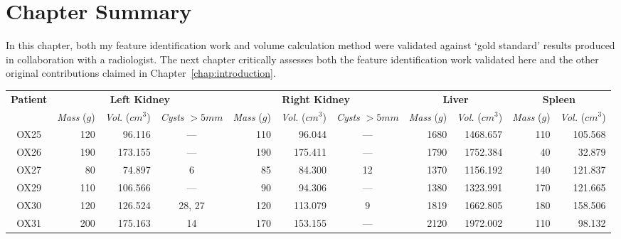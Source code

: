 \section{Chapter Summary}

In this chapter, both my feature identification work and volume calculation method were validated against `gold standard' results produced in collaboration with a radiologist. The next chapter critically assesses both the feature identification work validated here and the other original contributions claimed in Chapter~\ref{chap:introduction}.

\begin{landscape}
\begin{table}[p]
\footnotesize
\begin{center}
\begin{tabular}{c|rrc|rrc|rr|rr}
\textbf{Patient} & \multicolumn{3}{|c|}{\textbf{Left Kidney}} & \multicolumn{3}{|c|}{\textbf{Right Kidney}} & \multicolumn{2}{|c|}{\textbf{Liver}} & \multicolumn{2}{|c}{\textbf{Spleen}} \\
& \emph{Mass} ($g$) & \emph{Vol.} ($\mathit{cm}^3$) & \emph{Cysts} $> 5\mathit{mm}$ & \emph{Mass} ($g$) & \emph{Vol.} ($\mathit{cm}^3$) & \emph{Cysts} $> 5\mathit{mm}$ & \emph{Mass} ($g$) & \emph{Vol.} ($\mathit{cm}^3$) & \emph{Mass} ($g$) & \emph{Vol.} ($\mathit{cm}^3$) \\
\hline
\hline
OX25 & 120 &  96.116 &            --- & 110 &  96.044 &                            --- & 1680 & 1468.657 & 110 & 105.568 \\
OX26 & 190 & 173.155 &            --- & 190 & 175.411 &                            --- & 1790 & 1752.384 &  40 &  32.879 \\
OX27 &  80 &  74.897 &              6 &  85 &  84.300 &                             12 & 1370 & 1156.192 & 140 & 121.837 \\
OX29 & 110 & 106.566 &            --- &  90 &  94.306 &                            --- & 1380 & 1323.991 & 170 & 121.665 \\
OX30 & 120 & 126.524 &         28, 27 & 120 & 113.079 &                              9 & 1819 & 1662.805 & 180 & 158.506 \\
OX31 & 200 & 175.163 &             14 & 170 & 153.155 &                            --- & 2120 & 1972.002 & 110 &  98.132 \\

\end{tabular}
\end{center}
\end{table}
\end{landscape}
